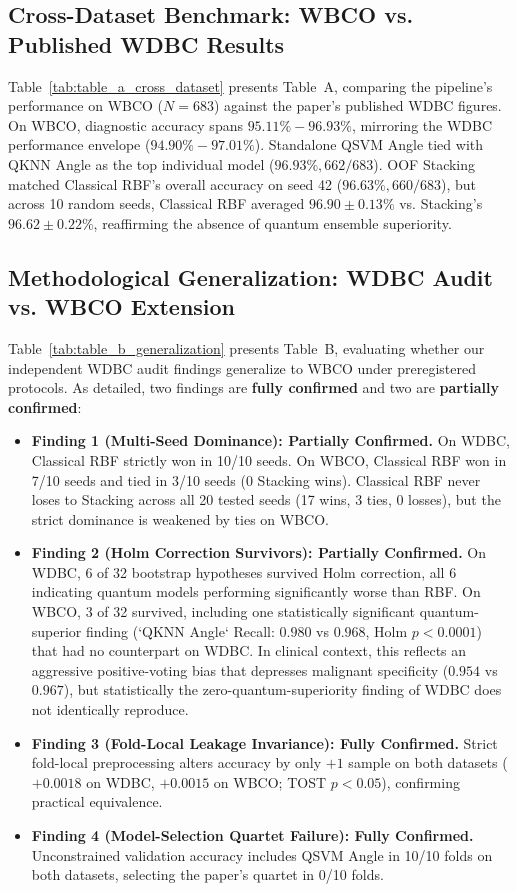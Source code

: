 \documentclass[journal,twocolumn]{IEEEtran}
\begin{document}
\subsection{Cross-Dataset Benchmark: WBCO vs. Published WDBC Results}
Table~\ref{tab:table_a_cross_dataset} presents Table~A, comparing the pipeline's performance on WBCO ($N=683$) against the paper's published WDBC figures. On WBCO, diagnostic accuracy spans $95.11\% - 96.93\%$, mirroring the WDBC performance envelope ($94.90\% - 97.01\%$). Standalone QSVM Angle tied with QKNN Angle as the top individual model ($96.93\%, 662/683$). OOF Stacking matched Classical RBF's overall accuracy on seed 42 ($96.63\%, 660/683$), but across 10 random seeds, Classical RBF averaged $96.90 \pm 0.13\%$ vs. Stacking's $96.62 \pm 0.22\%$, reaffirming the absence of quantum ensemble superiority.

\subsection{Methodological Generalization: WDBC Audit vs. WBCO Extension}
Table~\ref{tab:table_b_generalization} presents Table~B, evaluating whether our independent WDBC audit findings generalize to WBCO under preregistered protocols. As detailed, two findings are \textbf{fully confirmed} and two are \textbf{partially confirmed}:
\begin{itemize}
    \item \textbf{Finding 1 (Multi-Seed Dominance): Partially Confirmed.} On WDBC, Classical RBF strictly won in 10/10 seeds. On WBCO, Classical RBF won in 7/10 seeds and tied in 3/10 seeds (0 Stacking wins). Classical RBF never loses to Stacking across all 20 tested seeds (17 wins, 3 ties, 0 losses), but the strict dominance is weakened by ties on WBCO.
    \item \textbf{Finding 2 (Holm Correction Survivors): Partially Confirmed.} On WDBC, 6 of 32 bootstrap hypotheses survived Holm correction, all 6 indicating quantum models performing significantly worse than RBF. On WBCO, 3 of 32 survived, including one statistically significant quantum-superior finding (`QKNN Angle` Recall: $0.980$ vs $0.968$, Holm $p < 0.0001$) that had no counterpart on WDBC. In clinical context, this reflects an aggressive positive-voting bias that depresses malignant specificity ($0.954$ vs $0.967$), but statistically the zero-quantum-superiority finding of WDBC does not identically reproduce.
    \item \textbf{Finding 3 (Fold-Local Leakage Invariance): Fully Confirmed.} Strict fold-local preprocessing alters accuracy by only $+1$ sample on both datasets ($+0.0018$ on WDBC, $+0.0015$ on WBCO; TOST $p < 0.05$), confirming practical equivalence.
    \item \textbf{Finding 4 (Model-Selection Quartet Failure): Fully Confirmed.} Unconstrained validation accuracy includes QSVM Angle in 10/10 folds on both datasets, selecting the paper's quartet in 0/10 folds.
\end{itemize}
\end{document}
